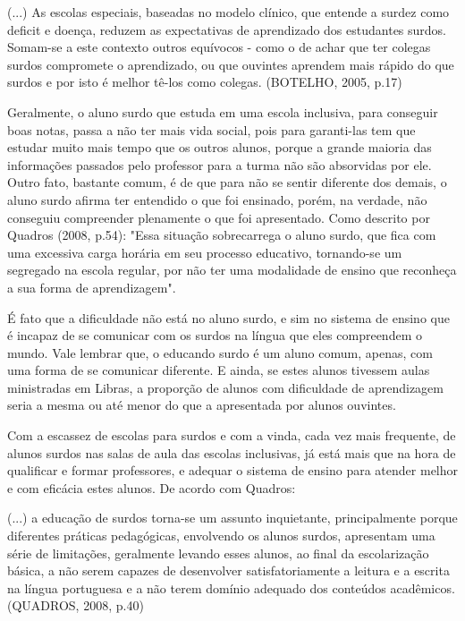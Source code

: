 \documentclass[brasil]{abnt}
\begin{document}
		\begin{citacao}(...) As escolas especiais, baseadas no modelo clínico, que entende a surdez como deficit e doença, reduzem as expectativas de aprendizado dos 
						estudantes surdos. Somam-se a este contexto outros equívocos - como o de achar que ter colegas surdos compromete o aprendizado, ou que ouvintes 
						aprendem mais rápido do que surdos e por isto é melhor tê-los como colegas. (BOTELHO, 2005, p.17)
		\end{citacao}
	
	Geralmente, o aluno surdo que estuda em uma escola inclusiva, para conseguir boas notas, passa a não ter mais vida social, pois para garanti-las tem que estudar
	muito mais tempo que os outros alunos, porque a grande maioria das informações passados pelo professor para a turma não são absorvidas por ele. Outro fato, bastante comum, é
	de que para não se sentir diferente dos demais, o aluno surdo afirma ter entendido o que foi ensinado, porém, na verdade, não conseguiu compreender plenamente o que foi apresentado.
	Como descrito por Quadros (2008, p.54): "Essa situação sobrecarrega o aluno surdo, que fica com uma excessiva carga horária em seu processo educativo, tornando-se um segregado na 
	escola regular, por não ter uma modalidade de ensino que reconheça a sua forma de aprendizagem". 
	
	É fato que a dificuldade não está no aluno surdo, e sim no sistema de ensino que é incapaz de se comunicar com os surdos na língua que eles compreendem o mundo. Vale lembrar que, 
	o educando surdo é um aluno comum, apenas, com uma forma de se comunicar diferente. E ainda, se estes alunos tivessem aulas ministradas em Libras, a proporção de alunos com dificuldade 
	de aprendizagem seria a mesma ou até menor do que a apresentada por alunos ouvintes.
	
	Com a escassez de escolas para surdos e com a vinda, cada vez mais frequente, de alunos surdos nas salas de aula das escolas inclusivas, já está mais que na hora de 
	qualificar e formar professores, e adequar o sistema de ensino para atender melhor e com eficácia estes alunos. De acordo com Quadros:
	
		\begin{citacao}(...) a educação de surdos torna-se um assunto inquietante, principalmente porque diferentes práticas pedagógicas, envolvendo os alunos surdos, apresentam
						uma série de limitações, geralmente levando esses alunos, ao final da escolarização básica, a não serem capazes de desenvolver satisfatoriamente a leitura 
						e a escrita na língua portuguesa e a não terem domínio adequado dos conteúdos acadêmicos. (QUADROS, 2008, p.40)
		\end{citacao}
	
\end{document}
